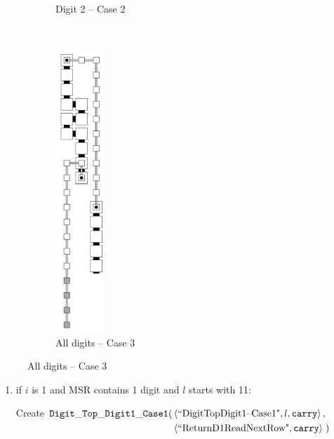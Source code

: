 \begin{itemize}
\begin{figure}[H]
\begin{subfigure}[t]{0.2\textwidth}
                    \caption{\label{fig:warping/digit_top_case2_digit2_msr} Digit 2 -- Case 2}
                \end{subfigure}%
                ~
                \begin{subfigure}[t]{0.2\textwidth}
                    \centering
                    \includegraphics[width=0.2\textwidth]{warping/digit_top_case3_digit3_msr}
                    \caption{\label{fig:warping/digit_top_case3_digit3_msr} All digits -- Case 3}
                \end{subfigure}%
            \end{figure}


            \begin{enumerate}[label=\alph*)]
                \item if $i$ is 1 and MSR contains 1 digit and $l$ starts with 11:

                Create
                $\begin{aligned}[t]
                    {\tt Digit\_Top\_Digit1\_Case1}(& \left \langle \text{``DigitTopDigit1--Case1"}, l, {\tt carry} \right\rangle, & \\
                                     & \left \langle \text{``ReturnD1ReadNextRow"},      {\tt carry} \right\rangle \;)
                \end{aligned}$
                \vspace{.5cm}



\end{enumerate}
\end{itemize}
